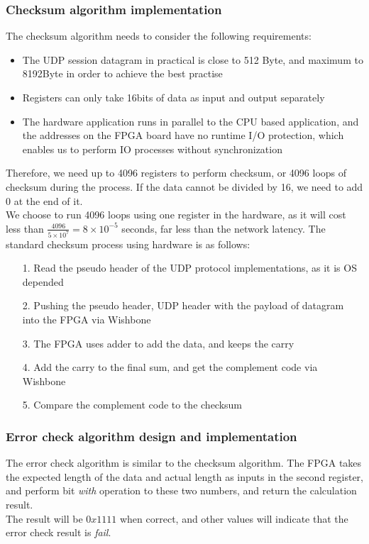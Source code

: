 \documentclass[11pt,openright,a4paper]{report}
\begin{document}
\subsubsection{Checksum algorithm implementation}
The checksum algorithm needs to consider the following requirements:
\begin{itemize}
	\item The UDP session datagram in practical is close to 512 Byte\cite{deering1998internet}, and maximum to 8192Byte in order to achieve the best practise
	\item Registers can only take 16bits of data as input and output separately
	\item The hardware application runs in parallel to the CPU based application, and the addresses on the FPGA board have no runtime I/O protection, which enables us to perform IO processes without synchronization
\end{itemize}
Therefore, we need up to 4096 registers to perform checksum, or 4096 loops of checksum during the process. If the data cannot be divided by 16, we need to add $0$ at the end of it.\\
We choose to run 4096 loops using one register in the hardware, as it will cost less than $\frac{4096}{5 \times 10^{7} }= 8 \times 10^{-5}$ seconds, far less than the network latency.
The standard checksum process using hardware is as follows:
\begin{itemize}
	\item[1.] Read the pseudo header of the UDP protocol implementations, as it is OS depended
	\item[2.] Pushing the pseudo header, UDP header with the payload of datagram into the FPGA via Wishbone
	\item[3.] The FPGA uses adder to add the data, and keeps the carry
	\item[4.] Add the carry to the final sum, and get the complement code via Wishbone
	\item[5.] Compare the complement code to the checksum
\end{itemize}
\subsubsection{Error check algorithm design and implementation}
The error check algorithm is similar to the checksum algorithm. The FPGA takes the expected length of the data and actual length as inputs in the second register, and perform bit \textit{with} operation to these two numbers, and return the calculation result.\\
The result will be $0x1111$ when correct, and other values will indicate that the error check result is \textit{fail}.\\
\end{document}
